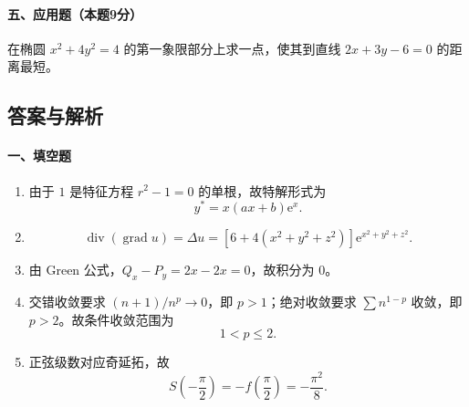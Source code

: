 \paragraph*{五、应用题（本题9分）}
在椭圆 \(x^2+4y^2=4\) 的第一象限部分上求一点，使其到直线 \(2x+3y-6=0\) 的距离最短。

\subsection{答案与解析}

\paragraph*{一、填空题}
\begin{enumerate}
  \item 由于 \(1\) 是特征方程 \(r^2-1=0\) 的单根，故特解形式为
  \[
    y^*=x(ax+b)\mathrm{e}^x.
  \]
  \item
  \[
    \operatorname{div}(\operatorname{grad}u)=\Delta u
    =\left[6+4(x^2+y^2+z^2)\right]\mathrm{e}^{x^2+y^2+z^2}.
  \]
  \item 由 Green 公式，\(Q_x-P_y=2x-2x=0\)，故积分为 \(0\)。
  \item 交错收敛要求 \((n+1)/n^p\to0\)，即 \(p>1\)；绝对收敛要求 \(\sum n^{1-p}\) 收敛，即 \(p>2\)。故条件收敛范围为
  \[
    1<p\le2.
  \]
  \item 正弦级数对应奇延拓，故
  \[
    S\left(-\frac{\pi}{2}\right)=-f\left(\frac{\pi}{2}\right)=-\frac{\pi^2}{8}.
  \]
\end{enumerate}

